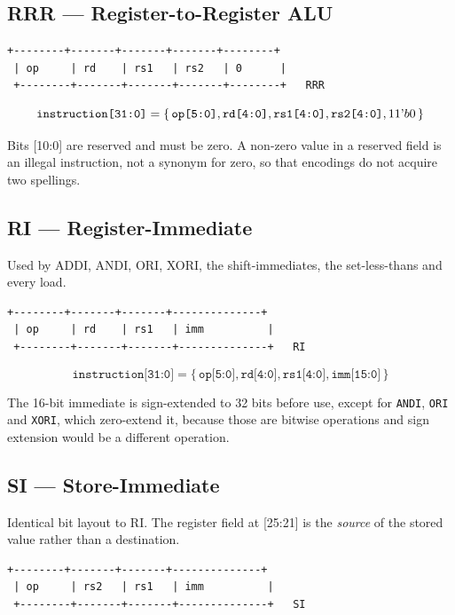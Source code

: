 \documentclass[11pt,a4paper]{article}
\begin{document}
\subsection{RRR --- Register-to-Register ALU}

\begin{lstlisting}[style=Bits]
 +--------+-------+-------+-------+--------+
 | op     | rd    | rs1   | rs2   | 0      |
 +--------+-------+-------+-------+--------+   RRR
\end{lstlisting}

\[
\texttt{instruction[31:0]} = \{\, \texttt{op[5:0]}, \texttt{rd[4:0]},
  \texttt{rs1[4:0]}, \texttt{rs2[4:0]}, 11\textrm{\textquoteright}b0 \,\}
\]

Bits [10:0] are reserved and must be zero. A non-zero value in a reserved field
is an illegal instruction, not a synonym for zero, so that encodings do not
acquire two spellings.

\subsection{RI --- Register-Immediate}

Used by ADDI, ANDI, ORI, XORI, the shift-immediates, the set-less-thans and
every load.

\begin{lstlisting}[style=Bits]
 +--------+-------+-------+--------------+
 | op     | rd    | rs1   | imm          |
 +--------+-------+-------+--------------+   RI
\end{lstlisting}

\[
\texttt{instruction[31:0]} = \{\, \texttt{op[5:0]}, \texttt{rd[4:0]},
  \texttt{rs1[4:0]}, \texttt{imm[15:0]} \,\}
\]

The 16-bit immediate is sign-extended to 32 bits before use, except for
\texttt{ANDI}, \texttt{ORI} and \texttt{XORI}, which zero-extend it, because
those are bitwise operations and sign extension would be a different operation.

\subsection{SI --- Store-Immediate}

Identical bit layout to RI. The register field at [25:21] is the \emph{source}
of the stored value rather than a destination.

\begin{lstlisting}[style=Bits]
 +--------+-------+-------+--------------+
 | op     | rs2   | rs1   | imm          |
 +--------+-------+-------+--------------+   SI
\end{lstlisting}
\end{document}
